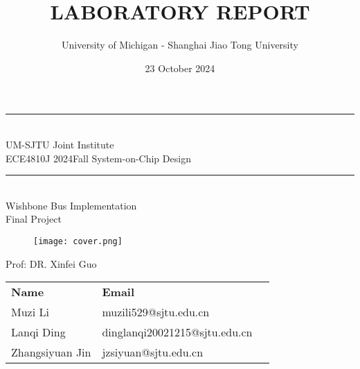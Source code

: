 \documentclass[12pt]{report}
\title{LABORATORY REPORT }
\author{University of Michigan - Shanghai Jiao Tong University}
\date{23 October 2024}
\begin{document}
{\centering
\scshape{
\rule[-3pt]{16.5cm}{0.01mm}\\
\vspace{0.5cm}
\large UM-SJTU Joint Institute
\vspace{0.2cm}
\\ECE4810J 2024Fall System-on-Chip Design
\rule[3pt]{16.5cm}{0.01mm}\\
\vspace{0.2cm}
{\LARGE{Wishbone Bus Implementation}}\\
\vspace{0.2cm}
{\Large{Final Project}}\\


\begin{figure}[H]
    \centering
    \texttt{[image: cover.png]}
    \label{fig:cover}
\end{figure}


\vspace{0.5cm}
Prof: DR. Xinfei Guo\\
}}
\vspace{0.3cm}


\vspace{0.5cm}

\begin{table}[h]
    \centering
    \begin{tabular}{l l l}
        \textbf{Name} & \textbf{Email} \\
         Muzi Li & muzili529@sjtu.edu.cn \\
         Lanqi Ding & dinglanqi20021215@sjtu.edu.cn \\
         Zhangsiyuan Jin & jzsiyuan@sjtu.edu.cn
    \end{tabular}
\end{table}
\end{document}
